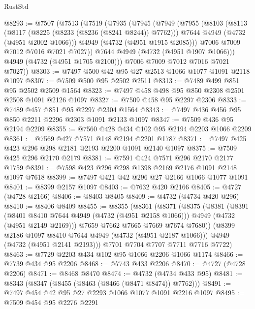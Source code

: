 \begin{lexlean}{RustStd}
\begin{coremodule}
{\begin{coremodule}
{{{{{{{{{{{{{{@8293 := @7507
    (@7513
      (@7519
        (@7935
          (@7945
            (@7949
              (@7955
                (@8103
                  (@8113
                    (@8117 (@8225 (@8233 (@8236 (@8241 @8244)) @7762)))
                    @7644
                    @4949
                    (@4732 (@4951 @2002 @1066)))
                  @4949
                  (@4732 (@4951 @1915 @2085)))
                @7006
                @7009
                @7012
                @7016
                @7021
                @7027))
            @7644
            @4949
            (@4732 (@4951 @1907 @1066)))
          @4949
          (@4732 (@4951 @1705 @2100)))
        @7006
        @7009
        @7012
        @7016
        @7021
        @7027))
@8303 := @7497 @500 @42 @95 @27 @2513 @1066 @1077 @1091 @2118 @1097
@8307 := @7509 @500 @95 @2502 @2511
@8313 := @7489 @499 @851 @95 @2502 @2509 @1564
@8323 := @7497 @458 @498 @95 @850 @2308 @2501 @2508 @1091 @2126 @1097
@8327 := @7509 @458 @95 @2297 @2306
@8333 := @7489 @457 @851 @95 @2297 @2304 @1564
@8343 := @7497 @436 @456 @95 @850 @2211 @2296 @2303 @1091 @2133 @1097
@8347 := @7509 @436 @95 @2194 @2209
@8355 := @7560 @428 @434 @102 @95 @2194 @2203 @1066 @2209
@8361 := @7569 @427 @7571 @148 @2194 @2201 @1787
@8371 := @7497 @425 @423 @296 @298 @2181 @2193 @2200 @1091 @2140 @1097
@8375 := @7509 @425 @296 @2170 @2179
@8381 := @7591 @424 @7571 @296 @2170 @2177 @1759
@8391 := @7598 @423 @296 @298 @1398 @2169 @2176 @1091 @2148 @1097 @7618
@8399 := @7497 @421 @42 @296 @27 @2166 @1066 @1077 @1091
@8401 := @8399 @2157 @1097
@8403 := @7632 @420 @2166
@8405 := @4727 (@4728 @2166)
@8406 := @8403 @8405
@8409 := @4732 (@4734 @420 @296)
@8410 := @8406 @8409
@8455 := @8355
    (@8361
      (@8371
        (@8375
          (@8381
            (@8391
              (@8401 @8410 @7644 @4949 (@4732 (@4951 @2158 @1066)))
              @4949
              (@4732 (@4951 @2149 @2169)))
            @7659
            @7662
            @7665
            @7669
            @7674
            @7680))
        (@8399 @2186 @1097 @8410 @7644 @4949 (@4732 (@4951 @2187 @1066)))
        @4949
        (@4732 (@4951 @2141 @2193)))
      @7701
      @7704
      @7707
      @7711
      @7716
      @7722)
@8463 := @7729 @2203 @434 @102 @95 @1066 @2206 @1066 @1174
@8466 := @7739 @434 @95 @2206
@8468 := @7743 @433 @2206
@8470 := @4727 (@4728 @2206)
@8471 := @8468 @8470
@8474 := @4732 (@4734 @433 @95)
@8481 := @8343 (@8347 (@8455 (@8463 (@8466 (@8471 @8474)) @7762)))
@8491 := @7497 @454 @42 @95 @27 @2293 @1066 @1077 @1091 @2216 @1097
@8495 := @7509 @454 @95 @2276 @2291
}}}}}}}}}}}}}}
\end{coremodule}}
\end{coremodule}
\end{lexlean}
